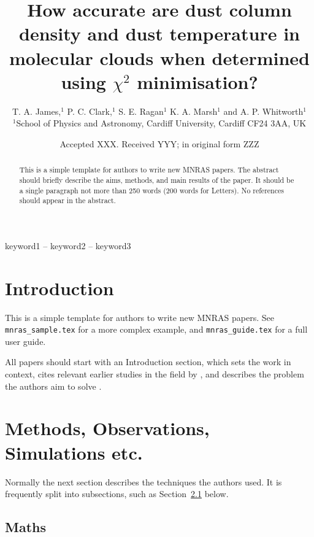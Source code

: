 \documentclass[a4paper,fleqn,usenatbib]{mnras}
\title[$N$ and $T$ using $\chi^{2}$ minimisation]{How accurate are dust column density and dust temperature in molecular clouds when determined using $\chi^{2}$ minimisation?}
\author[T. A. James et al.]{
T. A. James,$^{1}$ %
P. C. Clark,$^{1}$
S. E. Ragan$^{1}$
K. A. Marsh$^{1}$
and A. P. Whitworth$^{1}$
\\
$^{1}$School of Physics and Astronomy, Cardiff University, Cardiff CF24 3AA, UK
}
\date{Accepted XXX. Received YYY; in original form ZZZ}
\begin{document}
\label{firstpage}
\pagerange{\pageref{firstpage}--\pageref{lastpage}}
\maketitle

\begin{abstract}
This is a simple template for authors to write new MNRAS papers.
The abstract should briefly describe the aims, methods, and main results of the paper.
It should be a single paragraph not more than 250 words (200 words for Letters).
No references should appear in the abstract.
\end{abstract}

\begin{keywords}
keyword1 -- keyword2 -- keyword3
\end{keywords}



\section{Introduction}

This is a simple template for authors to write new MNRAS papers.
See \texttt{mnras\_sample.tex} for a more complex example, and \texttt{mnras\_guide.tex}
for a full user guide.

All papers should start with an Introduction section, which sets the work
in context, cites relevant earlier studies in the field by \citet{Others2013},
and describes the problem the authors aim to solve \citep[e.g.][]{Author2012}.

\section{Methods, Observations, Simulations etc.}

Normally the next section describes the techniques the authors used.
It is frequently split into subsections, such as Section~\ref{sec:maths} below.

\subsection{Maths}
\label{sec:maths} %
\end{document}
